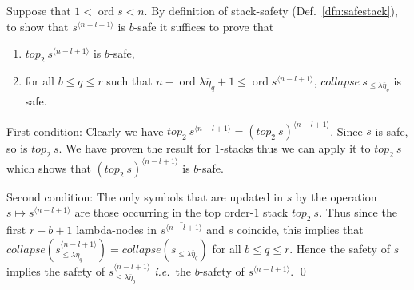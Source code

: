 \documentclass{article}
\newcommand{\ord}{\mathop{\mathrm{ord}}}
\newcommand{\prefixof}{\leqslant}
\theoremstyle{remark}
\theoremstyle{definition}
\newcommand\orddec\overline
\def\ie{{\it i.e.}\ }
\begin{document}
Suppose that $1<\ord{s}<n$.
By definition of stack-safety (Def.~\ref{dfn:safestack}), to show that $s^{\langle n-l+1 \rangle}$ is $b$-safe it suffices to prove that
\begin{enumerate}
\item $top_2~s^{\langle n-l+1 \rangle}$ is $b$-safe,
\item for all $b\leq q \leq r$ such that
$n-\ord{\lambda \overline{\eta}_{q}} +1 \leq \ord{s^{\langle n-l+1 \rangle}}$, $collapse~s_{\prefixof \lambda \overline{\eta}_{q}}$ is safe.
\end{enumerate}

First condition: Clearly we have $top_2~s^{\langle n-l+1 \rangle} = (top_2~s)^{\langle n-l+1 \rangle}$. Since $s$ is safe, so is $top_2~s$. We have proven the result for $1$-stacks thus we can apply it to $top_2~s$ which shows that $(top_2~s)^{\langle n-l+1 \rangle}$ is $b$-safe.
 
Second condition: The only symbols that are updated in $s$ by the operation $s \mapsto s^{\langle n-l+1 \rangle}$ are those occurring in the top order-$1$ stack $top_2~s$. Thus since the first $r-b+1$ lambda-nodes in $\orddec{s^{\langle n-l+1 \rangle}}$ and $\orddec{s}$ coincide, this implies that $collapse(s^{\langle n-l+1 \rangle}_{\prefixof\lambda\overline\eta_q}) = collapse(s_{\prefixof\lambda\overline\eta_q})$ for all $b \leq q \leq r$.
Hence the safety of $s$ implies the safety of $s^{\langle n-l+1 \rangle}_{\prefixof\lambda\overline\eta_b}$ \ie the $b$-safety of $s^{\langle n-l+1 \rangle}$.
\qed
\smallskip
\end{document}
